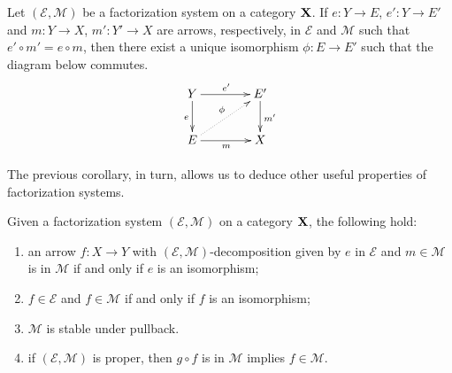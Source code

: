 \documentclass[a4paper,UKenglish,cleveref,pdftex,thm-restate,numberwithinsect]{lipics-v2021}
\def\X{\textbf {\textup{X}}}
\begin{document}
\begin{corollary}\label{prop:iso}
	Let $(\mathcal{E}, \mathcal{M})$ be a factorization system on a category $\X$. If $e\colon Y\to E$, $e'\colon Y\to E'$ and $m\colon Y\to X$, $m'\colon Y'\to X $ are arrows, respectively, in $\mathcal{E}$ and $\mathcal{M}$ such that
	$e'\circ m'=e\circ m$,  then  there exist a unique isomorphism $\phi\colon E \rightarrow E'$ such that the diagram below commutes.
	\[\xymatrix@C=40pt{Y \ar[r]^{e'} \ar[d]_{e}& E' \ar[d]^{m'}\\ E \ar[r]_{m} \ar@{.>}[ur]^{\phi}& X}\]
\end{corollary}

The previous corollary, in turn, allows us to deduce other useful properties of factorization systems.

\begin{proposition}\label{cor:iso} Given a factorization system $(\mathcal{E}, \mathcal{M})$ on a category $\X$, the following hold:
	\begin{enumerate}
		\item an arrow $f\colon X\to Y$ with $(\mathcal{E}, \mathcal{M})$-decomposition given by $e$ in $\mathcal{E}$ and $m\in \mathcal{M}$ is in $\mathcal{M}$ if and only if $e$ is an isomorphism;
		\item $f\in \mathcal{E}$ and $f\in \mathcal{M}$ if and only if $f$ is an isomorphism;
		\item $\mathcal{M}$ is stable under pullback.
		\item  if $(\mathcal{E}, \mathcal{M})$ is proper, then $g\circ f$ is in $\mathcal{M}$ implies $f\in \mathcal{M}$.
	\end{enumerate}
\end{proposition}
\end{document}
